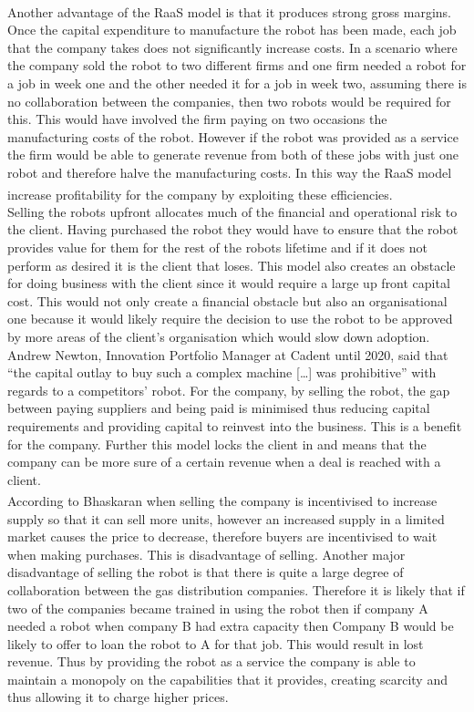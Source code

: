 \documentclass[11pt]{article}		%
\newcommand{\supercite}[1]{\textsuperscript{\cite{#1}}}		%
\begin{document}
            \\Another advantage of the RaaS model is that it produces strong gross margins.
            Once the capital expenditure to manufacture the robot has been made, each job that the company takes does not significantly increase costs. In a scenario where the company sold the robot to two different firms and  one firm needed a robot for a job in week one and the other needed it for a job in week two, assuming there is no collaboration between the companies, then two robots would be required for this. This would have involved the firm paying on two occasions the manufacturing costs of the robot. However if the robot was provided as a service the firm would be able to generate revenue from both of these jobs with just one robot and therefore halve the manufacturing costs. In this way the RaaS model increase profitability for the company by exploiting these efficiencies.  \supercite{monetise_RaaS}
            \\
            Selling the robots upfront allocates much of the financial and operational risk to the client. Having purchased the robot they would have to ensure that the robot provides value for them for the rest of the robots lifetime and if it does not perform as desired it is the client that loses. This model also creates an obstacle for doing business with the client since it would require a large up front capital cost. This would not only create a financial obstacle but also an organisational one because it would likely require the decision to use the robot to be approved by more areas of the client’s organisation which would slow down adoption. Andrew Newton, Innovation Portfolio Manager at Cadent until 2020, said that “the capital outlay to buy such a complex machine […] was prohibitive” with regards to a competitors’ robot. For the company, by selling the robot, the gap between paying suppliers and being paid is minimised thus reducing capital requirements and providing capital to reinvest into the business. This is a benefit for the company. Further this model locks the client in and means that the company can be more sure of a certain revenue when a deal is reached with a client.  
            \\
             According to Bhaskaran\supercite{leasing_strategy} when selling the company is incentivised to increase supply so that it can sell more units, however an increased supply in a limited market causes the price to decrease, therefore buyers are incentivised to wait when making purchases. This is disadvantage of selling. 
            Another major disadvantage of selling the robot is that there is quite a large degree of collaboration between the gas distribution companies. Therefore it is likely that if two of the companies became trained in using the robot then if company A needed a robot when company B had extra capacity then Company B would be likely to offer to loan the robot to A for that job. This would result in lost revenue. Thus by providing the robot as a service the company is able to maintain a monopoly on the capabilities that it provides, creating scarcity and thus allowing it to charge higher prices. 
        
\end{document}
